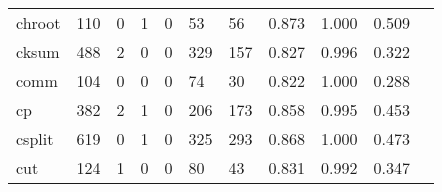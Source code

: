 \begin{longtable}{lp{1.2cm}p{1.2cm}p{1.2cm}p{1.2cm}p{1.2cm}p{1.2cm}p{1.2cm}p{1.2cm}p{1.2cm}p{1.2cm}}
chroot    &                                   110 &                                                  0 &                                                  1 &                                                  0 &                                                 53 &                                                 56 &                                              0.873 &                                              1.000 &                                              0.509 \\
cksum     &                                   488 &                                                  2 &                                                  0 &                                                  0 &                                                329 &                                                157 &                                              0.827 &                                              0.996 &                                              0.322 \\
comm      &                                   104 &                                                  0 &                                                  0 &                                                  0 &                                                 74 &                                                 30 &                                              0.822 &                                              1.000 &                                              0.288 \\
cp        &                                   382 &                                                  2 &                                                  1 &                                                  0 &                                                206 &                                                173 &                                              0.858 &                                              0.995 &                                              0.453 \\
csplit    &                                   619 &                                                  0 &                                                  1 &                                                  0 &                                                325 &                                                293 &                                              0.868 &                                              1.000 &                                              0.473 \\
cut       &                                   124 &                                                  1 &                                                  0 &                                                  0 &                                                 80 &                                                 43 &                                              0.831 &                                              0.992 &                                              0.347 \\

\end{longtable}
